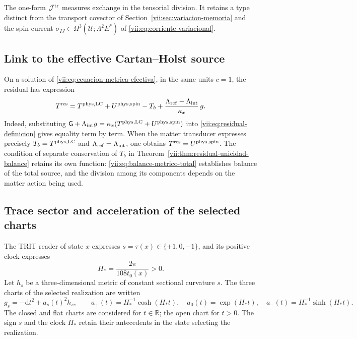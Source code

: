 The one-form \(\mathcal J^{\rm tr}\) measures exchange in the
tensorial division. It retains a type distinct from the transport
covector of Section~\ref{vii:sec:variacion-memoria} and the spin
current \(\sigma_{IJ}\in\Omega^3(\mathcal U;\Lambda^2E^*)\)
of \eqref{vii:eq:corriente-variacional}.

\subsection{Link to the effective Cartan--Holst source}
\label{vii:subsec:residual-fuente-cartan}

On a solution of \eqref{vii:eq:ecuacion-metrica-efectiva}, in the
same units \(c=1\), the residual has expression
\begin{equation}
 T^{\rm res}
 =T^{\rm phys,LC}+U^{\rm phys,spin}-T_b
   +\frac{\Lambda_{\rm ref}-\Lambda_{\rm int}}{\kappa_x}\,g.
 \label{vii:eq:residual-composicion-cartan}
\end{equation}
Indeed, substituting
\(\mathsf G+\Lambda_{\rm int}g
  =\kappa_x(T^{\rm phys,LC}+U^{\rm phys,spin})\)
into \eqref{vii:eq:residual-definicion} gives equality term by term.
When the matter transducer expresses precisely
\(T_b=T^{\rm phys,LC}\) and \(\Lambda_{\rm ref}=\Lambda_{\rm int}\),
one obtains \(T^{\rm res}=U^{\rm phys,spin}\).
The condition of separate conservation of \(T_b\) in
Theorem~\ref{vii:thm:residual-unicidad-balance} retains its own
function: \eqref{vii:eq:balance-metrico-total} establishes balance
of the total source, and the division among its components depends
on the matter action being used.

\subsection{Trace sector and acceleration of the selected charts}
\label{vii:subsec:residual-aceleracion-ds}

The TRIT reader of state \(x\) expresses \(s=\tau(x)\in\{+1,0,-1\}\),
and its positive clock expresses
\begin{equation}
 H_*=\frac{2\pi}{108t_0(x)}>0.
 \label{vii:eq:reloj-carta-ds}
\end{equation}
Let \(h_s\) be a three-dimensional metric of constant sectional
curvature \(s\). The three charts of the selected realization
are written
\begin{equation}
 g_s=-\mathrm dt^2+a_s(t)^2h_s,\qquad
 a_+(t)=H_*^{-1}\cosh(H_*t),\quad
 a_0(t)=\exp(H_*t),\quad
 a_-(t)=H_*^{-1}\sinh(H_*t).
 \label{vii:eq:cartas-ds-residual}
\end{equation}
The closed and flat charts are considered for \(t\in\mathbb R\);
the open chart for \(t>0\). The sign \(s\) and the clock \(H_*\)
retain their antecedents in the state selecting the realization.

